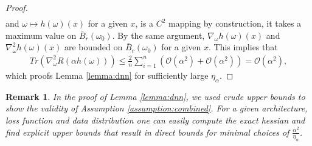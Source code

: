 \documentclass[10pt]{article} %
\newcommand{\cO}{\mathcal{O}}
\newtheorem{remark}{Remark}
\begin{document}
\begin{proof}
\begin{align*}
        \end{align*}
        and $\omega \mapsto h(\omega) (x)$ for a given $x$, is a $C^2$ mapping by construction, it takes a maximum value on $\bar{B}_r(\omega_0)$. By the same argument, $\nabla_\omega h(\omega)(x)$ and $\nabla^2_\omega h(\omega)(x)$ are bounded on $\bar{B}_r(\omega_0)$ for a given $x$. This implies that 
        \begin{align*}
            Tr(\nabla^2_\omega R(\alpha h(\omega)))\leq \frac{2}{n}\sum_{i=1}^n(\cO(\alpha^2)+\cO(\alpha^2))=\cO(\alpha^2),
        \end{align*}
        which proofs Lemma \ref{lemma:dnn} for sufficiently large $\eta_\alpha$. 
    \end{proof}
    \begin{remark}
        In the proof of Lemma \ref{lemma:dnn}, we used crude upper bounds to show the validity of Assumption \ref{assumption:combined}. For a given architecture, loss function and data distribution one can easily compute the exact hessian and find explicit upper bounds that result in direct bounds for minimal choices of $\frac{\alpha^2}{\eta_\alpha}$.
    \end{remark}
\end{document}
